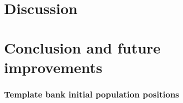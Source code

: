 



\section{\label{7:sec:discussion}Discussion}



\section{\label{7:sec:conclusion}Conclusion and future improvements}

\subsubsection{Template bank initial population positions}

% 





